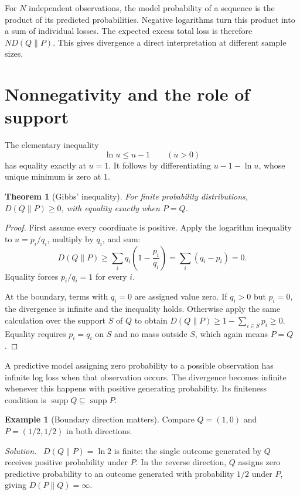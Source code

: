 \documentclass[11pt,oneside,openany]{book}
\newtheorem{theorem}{Theorem}[chapter]
\theoremstyle{definition}
\newtheorem{example}{Example}[chapter]
\theoremstyle{remark}
\newenvironment{solution}{\par\smallskip\noindent\textit{Solution.}\ }{\par\smallskip}
\numberwithin{equation}{chapter}
\begin{document}
For $N$ independent observations, the model probability of a sequence is the product of its predicted probabilities. Negative logarithms turn this product into a sum of individual losses. The expected excess total loss is therefore $N D(Q\|P)$. This gives divergence a direct interpretation at different sample sizes.

\section{Nonnegativity and the role of support}
The elementary inequality
\[
\ln u\leq u-1\qquad(u>0)
\]
has equality exactly at $u=1$. It follows by differentiating $u-1-\ln u$, whose unique minimum is zero at 1.

\begin{theorem}[Gibbs' inequality]
For finite probability distributions, $D(Q\|P)\geq0$, with equality exactly when $P=Q$.
\end{theorem}
\begin{proof}
First assume every coordinate is positive. Apply the logarithm inequality to $u=p_i/q_i$, multiply by $q_i$, and sum:
\[
D(Q\|P)\geq\sum_iq_i\left(1-\frac{p_i}{q_i}\right)
=\sum_i(q_i-p_i)=0.
\]
Equality forces $p_i/q_i=1$ for every $i$.

At the boundary, terms with $q_i=0$ are assigned value zero. If $q_i>0$ but $p_i=0$, the divergence is infinite and the inequality holds. Otherwise apply the same calculation over the support $S$ of $Q$ to obtain $D(Q\|P)\geq1-\sum_{i\in S}p_i\geq0$. Equality requires $p_i=q_i$ on $S$ and no mass outside $S$, which again means $P=Q$.
\end{proof}

A predictive model assigning zero probability to a possible observation has infinite log loss when that observation occurs. The divergence becomes infinite whenever this happens with positive generating probability. Its finiteness condition is $\operatorname{supp}Q\subseteq\operatorname{supp}P$.

\begin{example}[Boundary direction matters]
Compare $Q=(1,0)$ and $P=(1/2,1/2)$ in both directions.
\begin{solution}
$D(Q\|P)=\ln2$ is finite: the single outcome generated by $Q$ receives positive probability under $P$. In the reverse direction, $Q$ assigns zero predictive probability to an outcome generated with probability $1/2$ under $P$, giving $D(P\|Q)=\infty$.
\end{solution}
\end{example}
\end{document}
